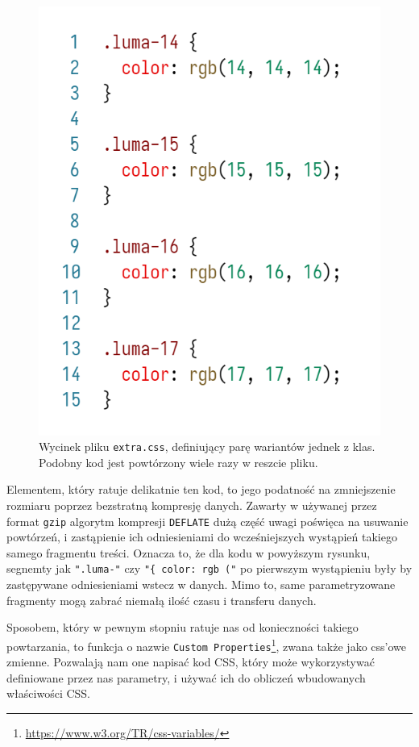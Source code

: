 \documentclass[licencjacka]{pracadypl}
\begin{document}
\begin{figure}[H]
  \centering
  \includegraphics[width=\linewidth/\real{2.5}]{images/code-css-luma.png}
  \caption{Wycinek pliku \texttt{extra.css}, definiujący parę wariantów jednek z klas. Podobny kod jest powtórzony wiele razy w reszcie pliku.}
  \label{fig:css-css-luma}
\end{figure}

Elementem, który ratuje delikatnie ten kod, to jego podatność na zmniejszenie rozmiaru poprzez bezstratną kompresję danych. Zawarty w używanej przez format \texttt{gzip} algorytm kompresji \texttt{DEFLATE} dużą część uwagi poświęca na usuwanie powtórzeń, i zastąpienie ich odniesieniami do wcześniejszych wystąpień takiego samego fragmentu treści. Oznacza to, że dla kodu w powyższym rysunku, segnemty jak \texttt{".luma-"} czy \texttt{"\{ color: rgb ("} po pierwszym wystąpieniu były by zastępywane odniesieniami wstecz w danych. Mimo to, same parametryzowane fragmenty mogą zabrać niemałą ilość czasu i transferu danych. 

Sposobem, który w pewnym stopniu ratuje nas od konieczności takiego powtarzania, to funkcja o nazwie \texttt{Custom Properties}\footnote{\url{https://www.w3.org/TR/css-variables/}}, zwana także jako css'owe zmienne. Pozwalają nam one napisać kod CSS, który może wykorzystywać definiowane przez nas parametry, i używać ich do obliczeń wbudowanych właściwości CSS.
\end{document}
